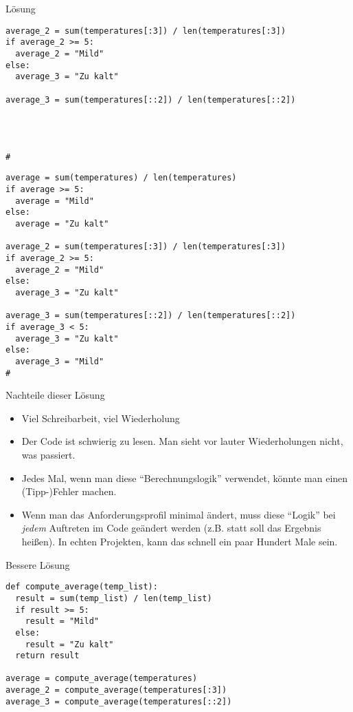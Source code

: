 \begin{fragile}{}
\begin{block}{Lösung }
\begin{overprint}
\begin{verbatim}
average_2 = sum(temperatures[:3]) / len(temperatures[:3])
if average_2 >= 5:
  average_2 = "Mild"
else: 
  average_3 = "Zu kalt"

average_3 = sum(temperatures[::2]) / len(temperatures[::2])




#
\end{verbatim}
\begin{verbatim}
average = sum(temperatures) / len(temperatures)
if average >= 5: 
  average = "Mild"
else: 
  average = "Zu kalt"

average_2 = sum(temperatures[:3]) / len(temperatures[:3])
if average_2 >= 5:
  average_2 = "Mild"
else: 
  average_3 = "Zu kalt"

average_3 = sum(temperatures[::2]) / len(temperatures[::2])
if average_3 < 5:
  average_3 = "Zu kalt"
else: 
  average_3 = "Mild"
#
\end{verbatim}
\end{overprint}
\end{block}
\end{fragile}

\begin{frame}
\begin{block}{Nachteile dieser Lösung}
	\pause 
	\begin{itemize}[<+->]
	\item Viel Schreibarbeit, viel Wiederholung
	\item Der Code ist schwierig zu lesen. Man sieht vor lauter Wiederholungen nicht, was passiert. 
	\item Jedes Mal, wenn man diese \enquote{Berechnungslogik} verwendet, könnte man einen (Tipp-)Fehler machen.  
	\item Wenn man das Anforderungsprofil minimal ändert, muss diese \enquote{Logik} bei \emph{jedem} Auftreten im Code geändert werden
		(z.B. statt  soll das Ergebnis  heißen). In echten Projekten, kann das schnell ein paar Hundert Male sein. 	
	\end{itemize}
\end{block}
\end{frame}

\begin{fragile}
\begin{block}{Bessere Lösung}
\begin{verbatim}
def compute_average(temp_list):
  result = sum(temp_list) / len(temp_list)
  if result >= 5:
    result = "Mild"
  else: 
    result = "Zu kalt"
  return result

average = compute_average(temperatures)
average_2 = compute_average(temperatures[:3])
average_3 = compute_average(temperatures[::2])
\end{verbatim}
\end{block}

\end{fragile}

